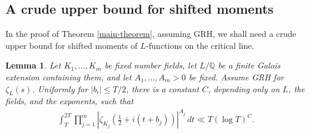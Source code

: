 \documentclass[twoside,reqno,11pt,a4paper]{amsart}
\numberwithin{equation}{section}
\theoremstyle{plain}
\newtheorem{lem}[thm]{Lemma}
\theoremstyle{definition}
\theoremstyle{remark}
\renewcommand{\le}{\leqslant}
\begin{document}
	\subsection{A crude upper bound for shifted moments}
In the proof of Theorem \ref{main-theorem}, assuming GRH, we shall need a crude upper bound for shifted moments of $L$-functions on the critical line.
\begin{lem}\label{shifted-moment-trivial-bound}
Let $K_1,\ldots,K_m$ be fixed number fields, let $L/\mathbb Q$ be a finite Galois extension containing them, and let $A_1,\ldots,A_m>0$ be fixed.  Assume GRH for $\zeta_L(s)$.  Uniformly for $|b_i|\le T/2$, there is a constant $C$, depending only on $L$, the fields, and the exponents, such that
		\begin{align*}
			\int_{T}^{2T} \prod_{j=1}^{m}\left| \zeta_{K_j}\left(\frac{1}{2}+i(t+b_j)\right)\right|^{A_j}\,dt\ll T(\log T)^C.
		\end{align*}
	\end{lem}
\end{document}

